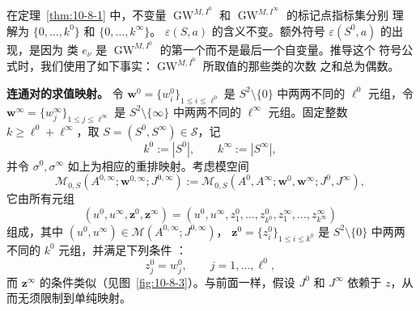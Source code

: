 \begin{remark}\label{rem:10-8-2}
在定理~\ref{thm:10-8-1} 中，不变量
$\operatorname{GW}^{M,I^0}$ 和 $\operatorname{GW}^{M,I^\infty}$ 的标记点指标集分别
理解为 $\{0,\ldots,k^0\}$ 和 $\{0,\ldots,k^\infty\}$。
$\varepsilon(S,a)$ 的含义不变。额外符号 $\varepsilon(S^0,a)$ 的出现，是因为
类 $e_\nu$ 是 $\operatorname{GW}^{M,I^0}$ 的第一个而不是最后一个自变量。推导这个
符号公式时，我们使用了如下事实：$\operatorname{GW}^{M,I^0}$ 所取值的那些类的次数
之和总为偶数。
\end{remark}

\medskip
\noindent\textbf{连通对的求值映射。}
令 $\mathbf w^0=\{w_i^0\}_{1\leq i\leq\ell^0}$ 是
$S^2\setminus\{0\}$ 中两两不同的 $\ell^0$ 元组，令
$\mathbf w^\infty=\{w_j^\infty\}_{1\leq j\leq\ell^\infty}$ 是
$S^2\setminus\{\infty\}$ 中两两不同的 $\ell^\infty$ 元组。固定整数
$k\geq\ell^0+\ell^\infty$，取 $S=(S^0,S^\infty)\in\mathcal S$，记
\[
  k^0:=|S^0|,\qquad k^\infty:=|S^\infty|,
\]
并令 $\sigma^0,\sigma^\infty$ 如上为相应的重排映射。考虑模空间
\[
  \mathcal M_{0,S}(A^{0,\infty};\mathbf w^{0,\infty};J^{0,\infty})
  :=\mathcal M_{0,S}(A^0,A^\infty;
  \mathbf w^0,\mathbf w^\infty;J^0,J^\infty),
\]
它由所有元组
\[
  (u^0,u^\infty,\mathbf z^0,\mathbf z^\infty)
  =(u^0,u^\infty,z_1^0,\ldots,z_{k^0}^0,
  z_1^\infty,\ldots,z_{k^\infty}^\infty)
\]
组成，其中 $(u^0,u^\infty)\in\mathcal M(A^{0,\infty};J^{0,\infty})$，
$\mathbf z^0=\{z_i^0\}_{1\leq i\leq k^0}$ 是
$S^2\setminus\{0\}$ 中两两不同的 $k^0$ 元组，并满足下列条件
：
\[
  z_j^0=w_j^0,\qquad j=1,\ldots,\ell^0,
\]
而 $\mathbf z^\infty$ 的条件类似（见图~\ref{fig:10-8-3}）。与前面一样，假设
$J^0$ 和 $J^\infty$ 依赖于 $z$，从而无须限制到单纯映射。


